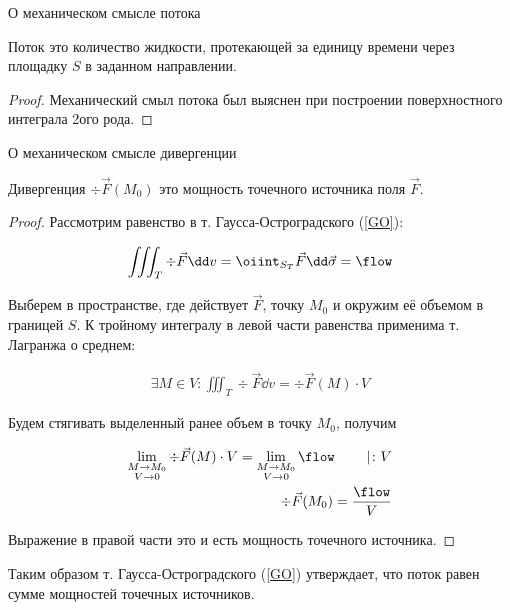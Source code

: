 
\begin{theorem}
  О механическом смысле потока

  Поток это количество жидкости, протекающей за единицу времени через площадку
  \(S\) в заданном направлении.
\end{theorem}
\begin{proof}
  Механический смыл потока был выяснен при построении поверхностного интеграла
  2ого рода.
\end{proof}

\begin{theorem}
  О механическом смысле дивергенции

  Дивергенция \(\div \vec{F}(M_{0})\) это мощность точечного источника
  поля \(\vec{F}\).
\end{theorem}
\begin{proof}
  Рассмотрим равенство в т. Гаусса-Остроградского (\ref{GO}):

  \begin{align*}
    \iiint_{T} \div \vec{F} \dd v
    = \oiint_{S_{T}} \vec{F} \dd \vec{\sigma}
    = \flow
  \end{align*}

  Выберем в пространстве, где действует \(\vec{F}\), точку \(M_{0}\) и окружим
  её объемом в границей \(S\). К тройному интегралу в левой части равенства
  применима т. Лагранжа о среднем:

  \begin{align*}
    \exists M \in V \colon
      \iiint_{T} \div \vec{F} \dd v = \div \vec{F}(M) \cdot V
  \end{align*}

  Будем стягивать выделенный ранее объем в точку \(M_{0}\), получим

  \begin{align*}
    \lim_{\substack{M \to M_{0} \\ V \to 0}}
      \div \vec{F}(M) \cdot V = 
    \lim_{\substack{M \to M_{0} \\ V \to 0}}
      \flow
    \hspace{20pt} \mid \colon V
    \\
    \div \vec{F}(M_{0}) = \frac{\flow}{V}
  \end{align*}

  Выражение в правой части это и есть мощность точечного источника.
\end{proof}

\begin{corollary}
  Таким образом т. Гаусса-Остроградского (\ref{GO}) утверждает, что поток равен
  сумме мощностей точечных источников.
\end{corollary}